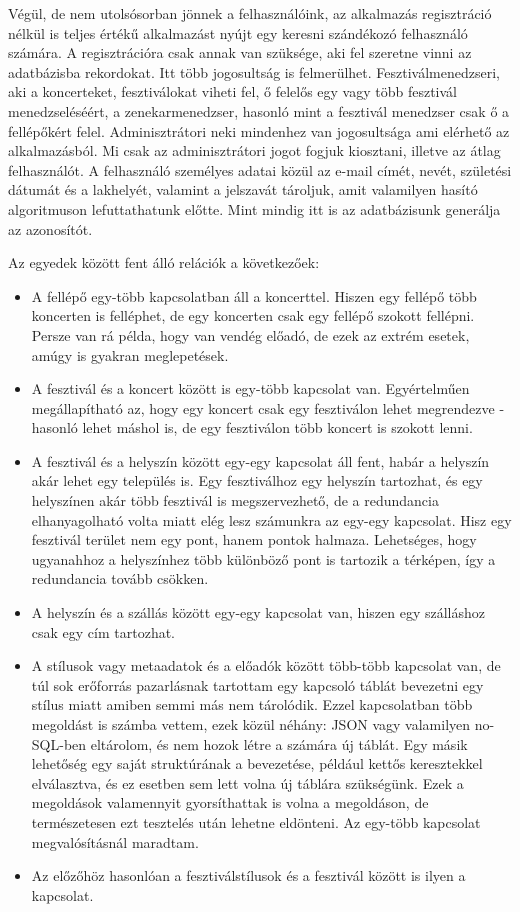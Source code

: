 Végül, de nem utolsósorban jönnek a felhasználóink, az alkalmazás regisztráció nélkül is teljes értékű alkalmazást nyújt egy keresni szándékozó felhasználó számára. A regisztrációra csak annak van szüksége, aki fel szeretne vinni az adatbázisba rekordokat. Itt több jogosultság is  felmerülhet. Fesztiválmenedzseri, aki a koncerteket, fesztiválokat viheti fel, ő felelős egy vagy több fesztivál menedzseléséért, a zenekarmenedzser, hasonló mint a fesztivál menedzser csak ő a fellépőkért felel. Adminisztrátori neki mindenhez van jogosultsága ami elérhető az alkalmazásból. Mi csak az adminisztrátori jogot fogjuk kiosztani, illetve az átlag felhasználót. A felhasználó személyes adatai közül az e-mail címét, nevét, születési dátumát és a lakhelyét, valamint a jelszavát tároljuk, amit valamilyen hasító algoritmuson lefuttathatunk előtte. Mint mindig itt is az adatbázisunk generálja az azonosítót.

Az egyedek között fent álló relációk a következőek:
\begin{itemize}
\item A fellépő egy-több kapcsolatban áll a koncerttel. Hiszen egy fellépő több koncerten is felléphet, de egy koncerten csak egy fellépő szokott fellépni. Persze van rá példa, hogy van vendég előadó, de ezek az extrém esetek, amúgy is gyakran meglepetések.
\item A fesztivál és a koncert között is egy-több kapcsolat van. Egyértelműen megállapítható az, hogy egy koncert csak egy fesztiválon lehet megrendezve - hasonló lehet máshol is, de egy fesztiválon több koncert is szokott lenni.
\item A fesztivál és a helyszín között egy-egy kapcsolat áll fent, habár a helyszín akár lehet egy település is. Egy fesztiválhoz egy helyszín tartozhat, és egy helyszínen akár több fesztivál is megszervezhető, de a redundancia elhanyagolható volta miatt elég lesz számunkra az egy-egy kapcsolat. Hisz egy fesztivál terület nem egy pont, hanem pontok halmaza. Lehetséges, hogy ugyanahhoz a helyszínhez több különböző pont is tartozik a térképen, így a redundancia tovább csökken.
\item  A helyszín és a szállás között egy-egy kapcsolat van, hiszen egy szálláshoz csak egy cím tartozhat.
\item A stílusok vagy metaadatok és a előadók között több-több kapcsolat van, de túl sok erőforrás pazarlásnak tartottam egy kapcsoló táblát bevezetni egy stílus miatt amiben semmi más nem tárolódik. Ezzel kapcsolatban több megoldást is számba vettem, ezek közül néhány: JSON vagy valamilyen no-SQL-ben eltárolom, és nem hozok létre a számára új táblát. Egy másik lehetőség egy saját struktúrának a bevezetése, például kettős keresztekkel elválasztva, és ez esetben sem lett volna új táblára szükségünk. Ezek a megoldások valamennyit gyorsíthattak is volna a megoldáson, de természetesen ezt tesztelés után lehetne eldönteni. Az egy-több kapcsolat megvalósításnál maradtam.
\item Az előzőhöz hasonlóan a fesztiválstílusok és a fesztivál között is ilyen a kapcsolat.
\end{itemize}


